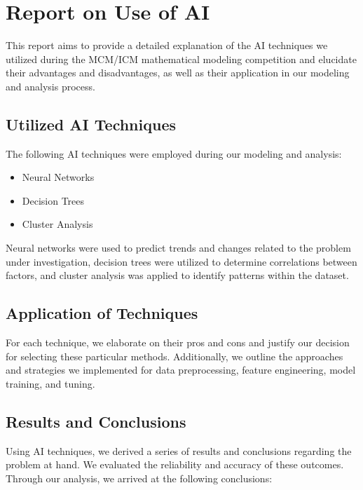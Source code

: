 \documentclass{mcmthesis}
\begin{document}
\newpage
{}
\setcounter{lastpage}{\value{page}}
\thispagestyle{empty} 

\section*{Report on Use of AI}

This report aims to provide a detailed explanation of the AI techniques we utilized during the MCM/ICM mathematical modeling competition and elucidate their advantages and disadvantages, as well as their application in our modeling and analysis process.

\subsection*{Utilized AI Techniques}

The following AI techniques were employed during our modeling and analysis:

\begin{itemize}[leftmargin=*]
\item Neural Networks
\item Decision Trees
\item Cluster Analysis
\end{itemize}

Neural networks were used to predict trends and changes related to the problem under investigation, decision trees were utilized to determine correlations between factors, and cluster analysis was applied to identify patterns within the dataset.

\subsection*{Application of Techniques}

For each technique, we elaborate on their pros and cons and justify our decision for selecting these particular methods. Additionally, we outline the approaches and strategies we implemented for data preprocessing, feature engineering, model training, and tuning.

\subsection*{Results and Conclusions}

Using AI techniques, we derived a series of results and conclusions regarding the problem at hand. We evaluated the reliability and accuracy of these outcomes. Through our analysis, we arrived at the following conclusions:
\end{document}
